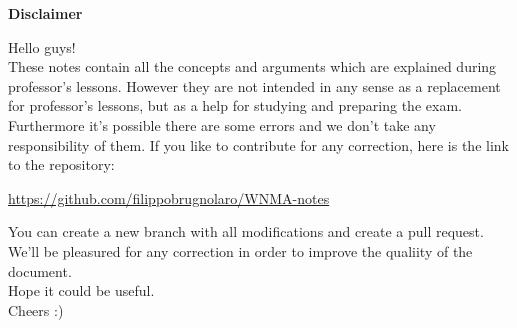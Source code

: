 \vspace*{\fill}
    \begin{center}
        \textbf{\Huge{Disclaimer}}\\
    \end{center}

    \vspace{1cm}

    Hello guys!\\
    These notes contain all the concepts and arguments which are explained
    during professor's lessons.
    However they are not intended in any sense as a replacement for professor's
    lessons, but as a help for studying and preparing the exam.
    Furthermore it's possible there are some errors and we don't take any responsibility
    of them. If you like
    to contribute for any correction, here is the link to the repository:
    \begin{center}
        \url{https://github.com/filippobrugnolaro/WNMA-notes}\\
    \end{center}
    You can create a new branch with all modifications and create a pull request.
    We'll be pleasured for any correction in order to improve the qualiity of the document.\\
    Hope it could be useful.\\Cheers :)

\vspace*{\fill}
